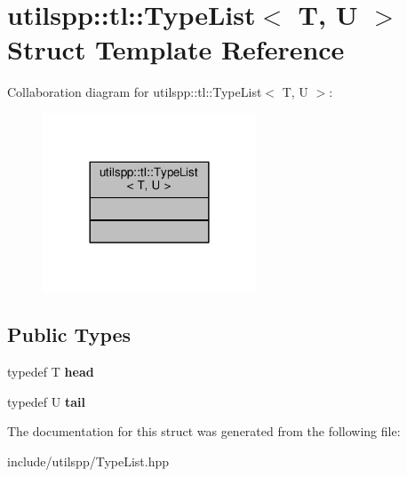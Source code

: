 \hypertarget{structutilspp_1_1tl_1_1TypeList}{\section{utilspp\-:\-:tl\-:\-:Type\-List$<$ T, U $>$ Struct Template Reference}
\label{structutilspp_1_1tl_1_1TypeList}
}


Collaboration diagram for utilspp\-:\-:tl\-:\-:Type\-List$<$ T, U $>$\-:
\nopagebreak
\begin{figure}[H]
\begin{center}
\leavevmode
\includegraphics[width=180pt]{structutilspp_1_1tl_1_1TypeList__coll__graph}
\end{center}
\end{figure}
\subsection*{Public Types}
\begin{DoxyCompactItemize}
\item 
\hypertarget{structutilspp_1_1tl_1_1TypeList_a832dc54bcef2339256b054a0b32cc28b}{typedef T {\bfseries head}}\label{structutilspp_1_1tl_1_1TypeList_a832dc54bcef2339256b054a0b32cc28b}

\item 
\hypertarget{structutilspp_1_1tl_1_1TypeList_ac53a6b2ccb7778c278be77ad81592cab}{typedef U {\bfseries tail}}\label{structutilspp_1_1tl_1_1TypeList_ac53a6b2ccb7778c278be77ad81592cab}

\end{DoxyCompactItemize}


The documentation for this struct was generated from the following file\-:\begin{DoxyCompactItemize}
\item 
include/utilspp/Type\-List.\-hpp\end{DoxyCompactItemize}
